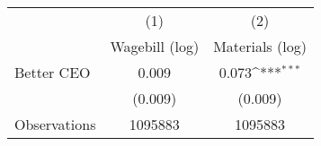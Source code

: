 {
\def\sym#1{\ifmmode^{#1}\else\(^{#1}\)\fi}
\begin{tabular}{l*{2}{c}}
\hline\hline
                    &\multicolumn{1}{c}{(1)}&\multicolumn{1}{c}{(2)}\\
                    &\multicolumn{1}{c}{Wagebill (log)}&\multicolumn{1}{c}{Materials (log)}\\
\hline
Better CEO          &       0.009         &       0.073\sym{***}\\
                    &     (0.009)         &     (0.009)         \\
\hline
Observations        &     1095883         &     1095883         \\
\hline\hline
\end{tabular}
}
